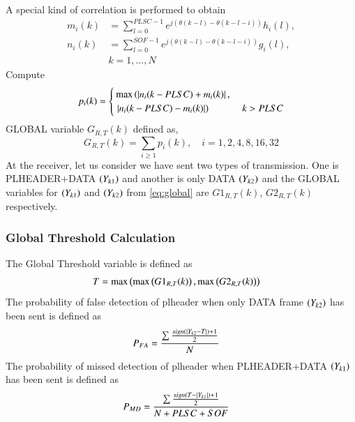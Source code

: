 A special kind of correlation is performed to obtain
\begin{align}
m_i(k)&=\sum_{l=0}^{PLSC-1} e^{j(\theta(k-l)-\theta(k-l-i))} h_i(l),
\\
n_i(k)&=\sum_{l=0}^{SOF-1} e^{j(\theta(k-l)-\theta(k-l-i))} g_i(l) ,
\\
&k = 1, \dots, N 
\end{align}
%
Compute
\begin{align}
p_i(k)=
\begin{cases}
\max \left(\left\vert n_i({k-PLSC})+m_i(k)\right\vert,\right. &
\\
\left.\left\vert n_i({k-PLSC})-m_i(k)\right\vert\right) & k > PLSC
\end{cases}
\end{align}
 GLOBAL variable $G_{R,T}(k)$  \cite{frame_offset} defined as,
\begin{equation}
G_{R,T}(k)=\sum_{i\geq1}p_i(k) , \quad i=1,2,4,8,16,32
\label{eq:global}
\end{equation}
At the receiver, let us consider we have sent two types of transmission. One is PLHEADER+DATA $\left(Y_{k1}\right)$ and another is only DATA $\left(Y_{k2}\right)$ and the GLOBAL variables for $\left(Y_{k1}\right)$ and $\left(Y_{k2}\right)$ from \eqref{eq:global} are $G1_{R,T}(k)$, $G2_{R,T}(k)$ respectively.
\subsubsection{Global Threshold Calculation}
The Global Threshold variable is defined as
\begin{align}
T&= \max \left( \max \left(G1_{R,T}(k)\right),\max \left( G2_{R,T}(k)\right)\right)
\end{align} 
The probability of false detection of plheader when only DATA frame $\left(Y_{k2}\right)$ has been sent is defined as
\begin{align}
P_{FA} &= \frac{\sum \frac{sign(\left\vert Y_{k2}-T\right\vert)+1}{2} }{N}
\end{align}
The probability of missed detection of plheader when PLHEADER+DATA $\left(Y_{k1}\right)$ has been sent is defined as
\begin{align}
P_{MD} &= \frac{\sum \frac{sign(T-\left\vert Y_{k1}\right\vert)+1}{2} }{N+PLSC+SOF}
\end{align}
